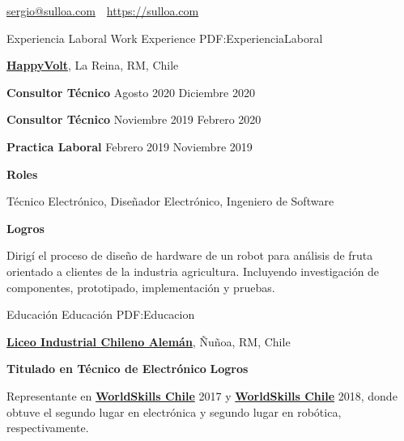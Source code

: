 \documentclass[letterpaper,yyyy,draft]{simpleresumecv}
\newcommand{\CVAuthor}{Sergio A. Ulloa B.}
\newcommand{\CVWebpage}{https://sulloa.com}
\begin{document}
\makeatletter
\let\@oddfoot\@empty{}
\let\@evenfoot\@empty{}
\makeatother

\Title{\CVAuthor}

{
    \begin{SubTitle}
    \href{mailto:sergio@sulloa.com}{sergio@sulloa.com}
    \,\SubBulletSymbol\,
    \href{\CVWebpage}{\url{\CVWebpage}}
    \end{SubTitle}
}

\begin{Body}


\Section
{Experiencia\newline
Laboral}
{Work Experience}
{PDF:ExperienciaLaboral}
{
    \Entry{}
    \href{https://happyvolt.com/}{\textbf{HappyVolt}},
    La Reina, RM, Chile

    \BulletItem{}
    \textbf{Consultor Técnico}
    \hfill
    Agosto 2020
    Diciembre 2020

    \Gap{}
    \BulletItem{}
    \textbf{Consultor Técnico}
    \hfill
    Noviembre 2019
    Febrero 2020

    \Gap{}
    \BulletItem{}
    \textbf{Practica Laboral}
    \hfill
    Febrero 2019
    Noviembre 2019

    \Gap{}
    \BulletItem{}
    \textbf{Roles}
    \hfill
    \begin{Detail}
    \SubBulletItem{}
    Técnico Electrónico, Diseñador Electrónico, Ingeniero de Software
    \end{Detail}

    \Gap{}
    \BulletItem{}
    \textbf{Logros}
    \hfill
    \begin{Detail}
    \SubBulletItem{}
    Dirigí el proceso de diseño de hardware de un robot para análisis de fruta orientado a clientes de la industria agricultura. Incluyendo investigación de componentes, prototipado, implementación y pruebas.
    \end{Detail}
}


\Section
{Educación}
{Educación}
{PDF:Educacion}
{
    \Entry{}
    \href{https://www.lichan.cl/}{\textbf{Liceo Industrial Chileno Alemán}},
    Ñuñoa, RM, Chile
    \hfill
     \-\- 

    \Gap{}
    \BulletItem{}
    \textbf{Titulado en Técnico de Electrónico}
    \Gap{}
    \BulletItem{}
    \textbf{Logros}
    \begin{Detail}
    \SubBulletItem{}
    Representante en \href{https://worldskills.org/}{\textbf{WorldSkills Chile}} 2017 y \href{https://worldskills.org/}{\textbf{WorldSkills Chile}} 2018, donde obtuve el segundo lugar en electrónica y segundo lugar en robótica, respectivamente.
    \end{Detail}
}


\end{Body}
\end{document}
